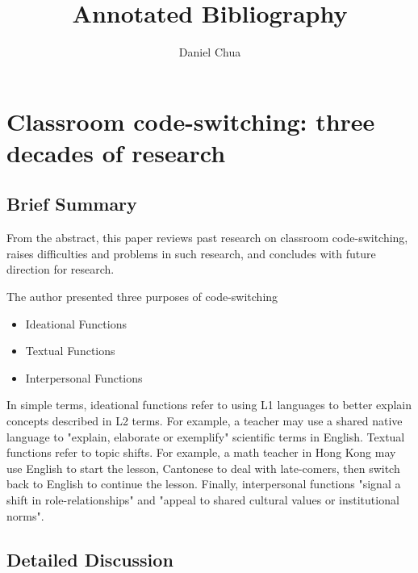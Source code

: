 \documentclass[12pt]{article}
\author{Daniel Chua}
\title{Annotated Bibliography}
\begin{document}
\maketitle

\section{Classroom code-switching: three decades of research}

\subsection{Brief Summary}

From the abstract, this paper reviews past research on classroom code-switching, raises difficulties and problems in such research, and concludes with future direction for research.

The author presented three purposes of code-switching

\begin{itemize}
    \item Ideational Functions
    \item Textual Functions
    \item Interpersonal Functions
\end{itemize}

In simple terms, ideational functions refer to using L1 languages to better explain concepts described in L2 terms. For example, a teacher may use a shared native language to "explain, elaborate or exemplify" scientific terms in English. Textual functions refer to topic shifts. For example, a math teacher in Hong Kong may use English to start the lesson, Cantonese to deal with late-comers, then switch back to English to continue the lesson. Finally, interpersonal functions "signal a shift in role-relationships" and "appeal to shared cultural values or institutional norms".

\subsection{Detailed Discussion}
\end{document}

